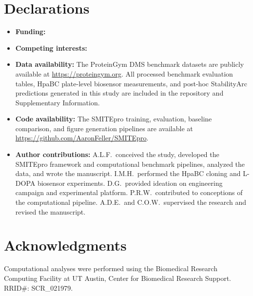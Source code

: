 \documentclass[sn-nature]{sn-jnl}
\begin{document}
\section*{Declarations}

\begin{itemize}
\item \textbf{Funding:}

\item \textbf{Competing interests:}

\item \textbf{Data availability:} The ProteinGym DMS benchmark datasets are publicly available at \url{https://proteingym.org}. All processed benchmark evaluation tables, HpaBC plate-level biosensor measurements, and post-hoc StabilityArc predictions generated in this study are included in the repository and Supplementary Information.

\item \textbf{Code availability:} The SMITEpro training, evaluation, baseline comparison, and figure generation pipelines are available at \url{https://github.com/AaronFeller/SMITEpro}.

\item \textbf{Author contributions:} A.L.F.\ conceived the study, developed the SMITEpro framework and computational benchmark pipelines, analyzed the data, and wrote the manuscript. I.M.H.\ performed the HpaBC cloning and L-DOPA biosensor experiments. D.G.\ provided ideation on engineering campaign and experimental platform. P.R.W.\ contributed to conceptions of the computational pipeline. A.D.E.\ and C.O.W.\ supervised the research and revised the manuscript.
\end{itemize}

\section*{Acknowledgments}

Computational analyses were performed using the Biomedical Research Computing Facility at UT Austin, Center for Biomedical Research Support. RRID\#: SCR\_021979.

\newpage
\end{document}
